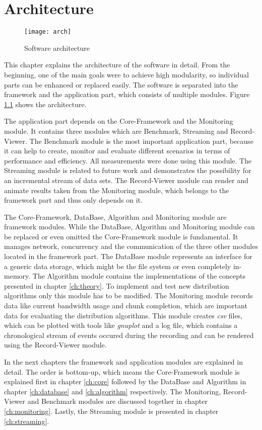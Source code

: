 \chapter{Architecture}
\label{ch:arch}

\begin{figure}[ht]
	\centering
	\texttt{[image: arch]}
	\caption{Software architecture}
	\label{fig:arch}
\end{figure}

This chapter explains the architecture of the software in detail. From the beginning, one of the main goals were to achieve high modularity, so individual parts can be enhanced or replaced easily. The software is separated into the framework and the application part, which consists of multiple modules. Figure \ref{fig:arch} shows the architecture. 

The application part depends on the Core-Framework and the Monitoring module. It contains three modules which are Benchmark, Streaming and Record-Viewer. The Benchmark module is the most important application part, because it can help to create, monitor and evaluate different scenarios in terms of performance and efficiency. All measurements were done using this module. The Streaming module is related to future work and demonstrates the possibility for an incremental stream of data sets. The Record-Viewer module can render and animate results taken from the Monitoring module, which belongs to the framework part and thus only depends on it.

The Core-Framework, DataBase, Algorithm and Monitoring module are framework modules. While the DataBase, Algorithm and Monitoring module can be replaced or even omitted the Core-Framework module is fundamental. It manages network, concurrency and the communication of the three other modules located in the framework part. The DataBase module represents an interface for a generic data storage, which might be the file system or even completely in-memory. The Algorithm module contains the implementations of the concepts presented in chapter \ref{ch:theory}. To implement and test new distribution algorithms only this module has to be modified. The Monitoring module records data like current bandwidth usage and chunk completion, which are important data for evaluating the distribution algorithms. This module creates \emph{csv} files, which can be plotted with tools like \emph{gnuplot} and a log file, which contains a chronological stream of events occured during the recording and can be rendered using the Record-Viewer module.

In the next chapters the framework and application modules are explained in detail. The order is bottom-up, which means the Core-Framework module is explained first in chapter \ref{ch:core} followed by the DataBase and Algorithm in chapter \ref{ch:database} and \ref{ch:algorithm} respectively. The Monitoring, Record-Viewer and Benchmark modules are discussed together in chapter \ref{ch:monitoring}. Lastly, the Streaming module is presented in chapter \ref{ch:streaming}.
